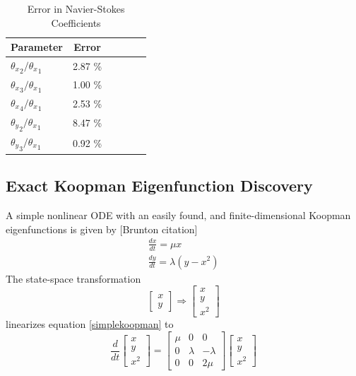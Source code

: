 \documentclass{article}
\begin{document}
\begin{table}[t]
\caption{Error in Navier-Stokes Coefficients}
\label{tab:ns_data}
\vskip 0.15in
\begin{center}
\begin{small}
\begin{sc}
\begin{tabular}{lccccr}
\toprule
Parameter & Error \\
\midrule
${\theta_x}_2 / {\theta_x}_1 $ & 2.87 \% \\
${\theta_x}_3 / {\theta_x}_1 $ & 1.00 \% \\
${\theta_x}_4 / {\theta_x}_1 $ & 2.53 \% \\
${\theta_y}_2 / {\theta_x}_1 $ & 8.47 \% \\
${\theta_y}_3 / {\theta_x}_1 $ & 0.92 \% \\
\bottomrule
\end{tabular}
\end{sc}
\end{small}
\end{center}
\vskip -0.1in
\end{table}

\subsection{Exact Koopman Eigenfunction Discovery}
\label{exactdiscovery}
A simple nonlinear ODE with an easily found, and finite-dimensional Koopman eigenfunctions is given by [Brunton citation]
\begin{equation}
\begin{split}
  \label{simplekoopman}
\frac{dx}{dt} = \mu x \\
\frac{dy}{dt} = \lambda(y - x^2)
\end{split}
\end{equation}
The state-space transformation
\begin{equation}
    \label{eqn:exacttransform}
\begin{bmatrix}
x\\
y
\end{bmatrix} \Rightarrow \begin{bmatrix}
x \\
y \\
x^2
\end{bmatrix}
\end{equation}
linearizes equation \ref{simplekoopman} to
\begin{equation}
    \label{eqn:koopmanop}
\frac{d}{dt} \begin{bmatrix}
x \\
y \\
x^2
\end{bmatrix} = \begin{bmatrix}
\mu & 0 & 0 \\
0 & \lambda & -\lambda \\
0 & 0 & 2 \mu
\end{bmatrix} \begin{bmatrix}
x \\
y \\
x^2
\end{bmatrix}
\end{equation}
\end{document}
